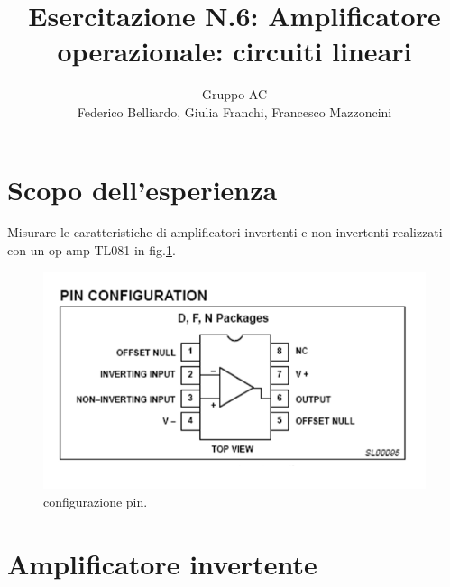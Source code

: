 \documentclass[10pt,a4paper]{article}
\author{Gruppo AC \\ Federico Belliardo, Giulia Franchi, Francesco Mazzoncini}
\title{Esercitazione N.6: Amplificatore operazionale: circuiti lineari}
\begin{document}
\maketitle
\section{Scopo dell'esperienza}

Misurare le caratteristiche di amplificatori invertenti e non invertenti realizzati con un op-amp TL081 in fig.\ref{pin}.
\begin{figure}[!htb]
  \centering
  \includegraphics[scale=0.5]{pinrelaz6.png}
\caption{configurazione pin.}
\label{pin}
\end{figure}

\section{Amplificatore invertente}
\end{document}
